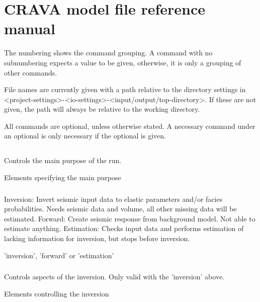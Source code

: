 
\chapter{CRAVA model file reference manual}
\label{ap:model-file-reference}
The numbering shows the command grouping. A command with no subnumbering expects a value to be given, otherwise, it is only a grouping of other commands.

File names are currently given with a path relative to the directory settings in <project-settings>-<io-settings>-<input/output/top-directory>. If these are not given, the path will always be relative to the working directory.

All commands are optional, unless otherwise stated. A necessary command under an optional is only necessary if the optional is given.


\section{\necessary} 
 \slist
   \item \Description Controls the main purpose of the run.
   \item \Argument Elements specifying the main purpose
   \item \Default
 \elist

\subsection{\necessary}  
 \slist
   \item \Description Inversion: Invert seismic input data to elastic parameters and/or facies probabilities. Needs seismic data and volume, all other missing data will be estimated.
Forward: Create seismic response from background model. Not able to estimate anything.
Estimation: Checks input data and performs estimation of lacking information for inversion, but stops before inversion.
   \item \Argument 'inversion', 'forward' or 'estimation'
   \item \Default
 \elist

\subsection{}  
 \slist
   \item \Description Controls aspects of the inversion. Only valid with the  'inversion' above.
   \item \Argument Elements controlling the inversion
   \item \Default
 \elist

